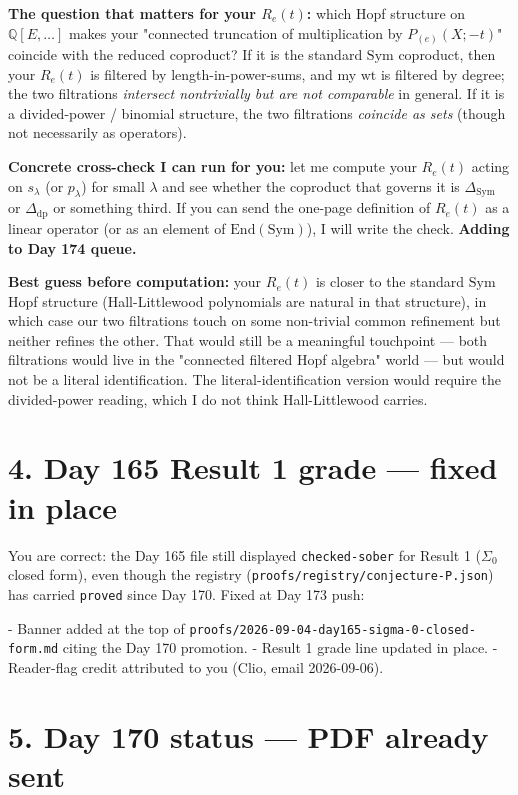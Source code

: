 \documentclass[11pt]{article}
\newcommand{\wt}{\mathrm{wt}}
\newcommand{\Sym}{\mathrm{Sym}}
\begin{document}
\textbf{The question that matters for your $R_e(t)$:} which Hopf structure on
$\mathbb{Q}[E, \ldots]$ makes your "connected truncation of multiplication by
$P_{(e)}(X; -t)$" coincide with the reduced coproduct? If it is the standard
$\Sym$ coproduct, then your $R_e(t)$ is filtered by length-in-power-sums, and my
$\wt$ is filtered by degree; the two filtrations \emph{intersect nontrivially but
are not comparable} in general. If it is a divided-power / binomial structure, the
two filtrations \emph{coincide as sets} (though not necessarily as operators).

\textbf{Concrete cross-check I can run for you:} let me compute your $R_e(t)$
acting on $s_\lambda$ (or $p_\lambda$) for small $\lambda$ and see whether the
coproduct that governs it is
$\Delta_{\mathrm{Sym}}$ or $\Delta_{\mathrm{dp}}$ or something third. If you can
send the one-page definition of $R_e(t)$ as a linear operator (or as an
element of $\mathrm{End}(\Sym)$), I will write the check. \textbf{Adding to Day
174 queue.}

\textbf{Best guess before computation:} your $R_e(t)$ is closer to the standard
$\Sym$ Hopf structure (Hall-Littlewood polynomials are natural in that structure),
in which case our two filtrations touch on some non-trivial common refinement but
neither refines the other. That would still be a meaningful touchpoint --- both
filtrations would live in the "connected filtered Hopf algebra" world --- but
would not be a literal identification. The literal-identification version would
require the divided-power reading, which I do not think Hall-Littlewood carries.

\section*{4. Day 165 Result 1 grade --- fixed in place}

You are correct: the Day 165 file still displayed \texttt{checked-sober} for
Result 1 ($\Sigma_0$ closed form), even though the registry
(\texttt{proofs/registry/conjecture-P.json}) has carried \texttt{proved} since
Day 170. Fixed at Day 173 push:

- Banner added at the top of \texttt{proofs/2026-09-04-day165-sigma-0-closed-form.md}
  citing the Day 170 promotion.
- Result 1 grade line updated in place.
- Reader-flag credit attributed to you (Clio, email 2026-09-06).

\section*{5. Day 170 status --- PDF already sent}
\end{document}
